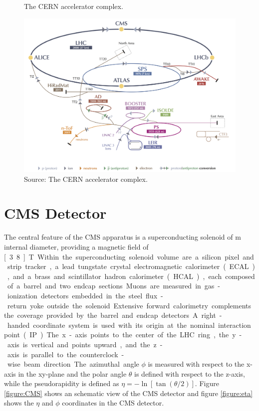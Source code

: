 \begin{figure}[H]
\caption{The CERN accelerator complex.\label{fig:LHC}}
  \centering
\includegraphics[width=13cm]{CMS_chapter_plots/lhc3}
\caption*{Source: The CERN accelerator complex. \cite{Haffner:1621894} }
\end{figure}

\section{CMS Detector}

The central feature of the CMS apparatus is a superconducting solenoid of \unit[6]{m} internal diameter, providing a magnetic field of \unit[3.8]{T}.Within the superconducting solenoid volume are a silicon pixel and strip tracker, a lead tungstate crystal electromagnetic calorimeter (ECAL), and a brass and scintillator hadron calorimeter (HCAL), each composed of a barrel and two endcap sections. Muons are measured in gas-ionization detectors embedded in the steel flux-return yoke outside the solenoid. Extensive forward calorimetry complements the coverage provided by the barrel and endcap detectors. A right-handed coordinate system is used with its origin at the nominal interaction point (IP). The x-axis points to the center of the LHC ring, the y-axis is vertical and points upward, and the z-axis is parallel to the counterclock-wise beam direction. The azimuthal angle $\phi$ is measured with respect to the x-axis in the xy-plane and the polar angle $\theta$ is defined with respect to the z-axis, while the pseudorapidity is defined as $\eta = -\ln\left[\tan\left(\theta/2 \right)  \right]$. Figure \ref{figure:CMS} shows an schematic view of the CMS detector and figure \ref{figure:eta} shows the $\eta$ and $\phi$ coordinates in the CMS detector.

